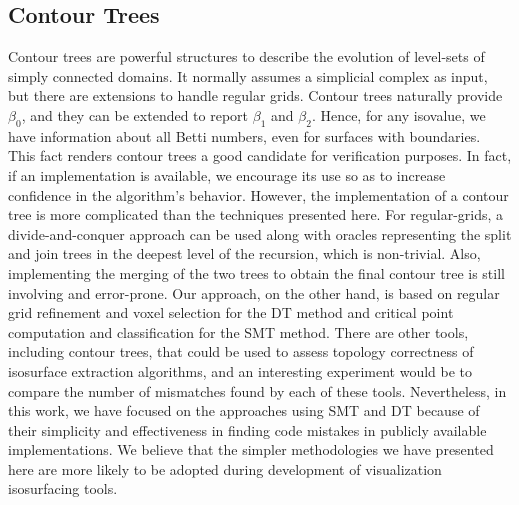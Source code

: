 \subsection{Contour Trees}
Contour trees \cite{Hamish03} are powerful structures to describe the
evolution of level-sets of simply connected domains. It normally
assumes a simplicial complex as input, but there are extensions to
handle regular grids\cite{Pascucci03}. Contour trees naturally provide
$\beta_0$, and they can be extended to report $\beta_1$ and
$\beta_2$. Hence, for any isovalue, we have information about all
Betti numbers, even for surfaces with boundaries.  This fact renders
contour trees a good candidate for verification purposes. In fact, if an
implementation is available, we encourage its use so as to increase
confidence in the algorithm's behavior.  However, the implementation of
a contour tree is more complicated than the techniques presented here.
For regular-grids, a divide-and-conquer approach can be used along
with oracles representing the split and join trees in the deepest
level of the recursion, which is non-trivial. Also, implementing the
merging of the two trees to obtain the final contour tree is still
involving and error-prone.  Our approach, on the other
hand, is based on regular grid refinement and voxel selection for the DT
method and critical point computation and classification for the SMT
method.  There are other tools, including contour trees, that could be
used to assess topology correctness of isosurface extraction
algorithms, and an interesting experiment would be to compare the
number of mismatches found by each of these tools.  Nevertheless, in
this work, we have focused on the approaches using SMT and DT because
of their simplicity and effectiveness in finding code
mistakes in publicly available implementations.  We believe that the
simpler methodologies we have presented here are more likely to be
adopted during development of visualization isosurfacing tools.

